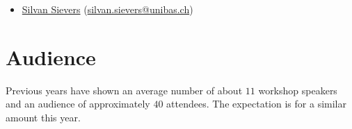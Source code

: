 \documentclass[10pt]{article}
\begin{document}
\begin{itemize}



\item \href{http://ai.cs.unibas.ch/people/}{Silvan Sievers}
  (\href{mailto:silvan.sievers@unibas.ch}{silvan.sievers@unibas.ch})\\



\end{itemize}

\section*{Audience}
Previous years have shown an average number of about $11$ workshop
speakers and an audience of approximately $40$ attendees. The
expectation is for a similar amount this year.
\end{document}
